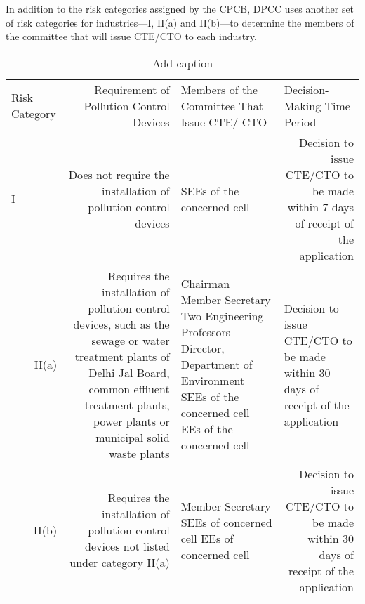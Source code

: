 \documentclass[a4paper, 12pt]{article}
\begin{document}
                 In addition to the risk categories assigned by the CPCB, DPCC uses another set of risk categories for industries—I, II(a) and II(b)—to determine the members of the committee that will issue CTE/CTO to each industry.
                 
\begin{table}[htbp]
  \centering
  \caption{Add caption}
    \begin{tabular}{rrlr}
    \multicolumn{1}{l}{Risk Category} & \multicolumn{1}{p{10.415em}}{Requirement of Pollution Control Devices} & \multicolumn{1}{p{12.585em}}{Members of the Committee That Issue CTE/ CTO} & \multicolumn{1}{l}{Decision-Making Time Period} \\
    \multicolumn{1}{l}{I} & \multicolumn{1}{p{10.415em}}{Does not require the installation of pollution control devices} & \multicolumn{1}{p{12.585em}}{SEEs of the concerned cell} & \multicolumn{1}{p{12em}}{Decision to issue CTE/CTO to be made within 7 days of receipt of the application} \\
    \multicolumn{1}{r}{\multirow{6}[0]{*}{II(a)}} & \multicolumn{1}{r}{\multirow{6}[0]{*}{Requires the installation of pollution control devices, such as the sewage or water treatment plants of Delhi Jal Board, common effluent treatment plants, power plants or municipal solid waste plants}} & \multicolumn{1}{l}{\multirow{6}[0]{*}{Chairman
Member Secretary
Two Engineering Professors
Director, Department of Environment 
SEEs of the concerned cell
EEs of the concerned cell
}} & \multicolumn{1}{l}{\multirow{6}[0]{*}{Decision to issue CTE/CTO to be made within 30 days of receipt of the application}} \\
          &       &       &  \\
          &       &       &  \\
          &       &       &  \\
          &       &       &  \\
          &       &       &  \\
    \multicolumn{1}{r}{\multirow{3}[0]{*}{II(b)}} & \multicolumn{1}{r}{\multirow{3}[0]{*}{Requires the installation of pollution control devices not listed under category II(a)}} & \multicolumn{1}{l}{\multirow{3}[0]{*}{Member Secretary
SEEs of concerned cell
EEs of concerned cell}} & \multicolumn{1}{r}{\multirow{3}[0]{*}{Decision to issue CTE/CTO to be made within 30 days of receipt of the application}} \\
          &       &       &  \\
          &       &       &  \\
    \end{tabular}%
  \label{tab:addlabel}%
\end{table}%




                 
             
\end{document}
